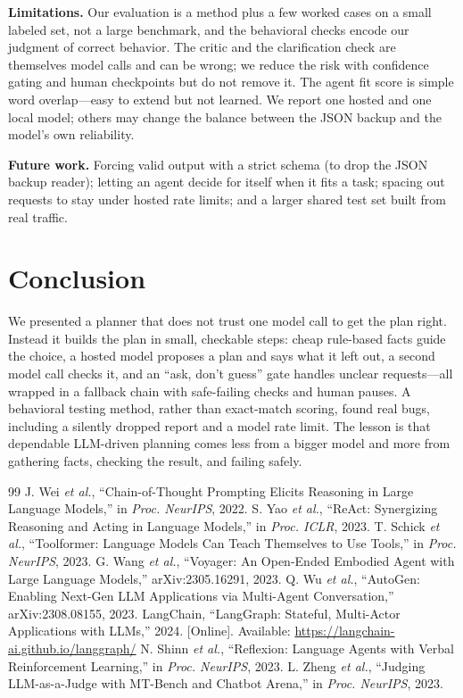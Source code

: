 \documentclass[conference]{IEEEtran}
\begin{document}
\textbf{Limitations.} Our evaluation is a method plus a few worked cases on a small
labeled set, not a large benchmark, and the behavioral checks encode our judgment of
correct behavior. The critic and the clarification check are themselves model calls
and can be wrong; we reduce the risk with confidence gating and human checkpoints but
do not remove it. The agent fit score is simple word overlap---easy to extend but not
learned. We report one hosted and one local model; others may change the balance
between the JSON backup and the model's own reliability.

\textbf{Future work.} Forcing valid output with a strict schema (to drop the JSON
backup reader); letting an agent decide for itself when it fits a task; spacing out
requests to stay under hosted rate limits; and a larger shared test set built from
real traffic.

\section{Conclusion}
We presented a planner that does not trust one model call to get the plan right.
Instead it builds the plan in small, checkable steps: cheap rule-based facts guide
the choice, a hosted model proposes a plan and says what it left out, a second model
call checks it, and an ``ask, don't guess'' gate handles unclear requests---all
wrapped in a fallback chain with safe-failing checks and human pauses. A behavioral
testing method, rather than exact-match scoring, found real bugs, including a
silently dropped report and a model rate limit. The lesson is that dependable
LLM-driven planning comes less from a bigger model and more from gathering facts,
checking the result, and failing safely.

\begin{thebibliography}{99}
 J. Wei \emph{et al.}, ``Chain-of-Thought Prompting Elicits Reasoning in Large Language Models,'' in \emph{Proc. NeurIPS}, 2022.
 S. Yao \emph{et al.}, ``ReAct: Synergizing Reasoning and Acting in Language Models,'' in \emph{Proc. ICLR}, 2023.
 T. Schick \emph{et al.}, ``Toolformer: Language Models Can Teach Themselves to Use Tools,'' in \emph{Proc. NeurIPS}, 2023.
 G. Wang \emph{et al.}, ``Voyager: An Open-Ended Embodied Agent with Large Language Models,'' arXiv:2305.16291, 2023.
 Q. Wu \emph{et al.}, ``AutoGen: Enabling Next-Gen LLM Applications via Multi-Agent Conversation,'' arXiv:2308.08155, 2023.
 LangChain, ``LangGraph: Stateful, Multi-Actor Applications with LLMs,'' 2024. [Online]. Available: \url{https://langchain-ai.github.io/langgraph/}
 N. Shinn \emph{et al.}, ``Reflexion: Language Agents with Verbal Reinforcement Learning,'' in \emph{Proc. NeurIPS}, 2023.
 L. Zheng \emph{et al.}, ``Judging LLM-as-a-Judge with MT-Bench and Chatbot Arena,'' in \emph{Proc. NeurIPS}, 2023.
\end{thebibliography}
\end{document}
